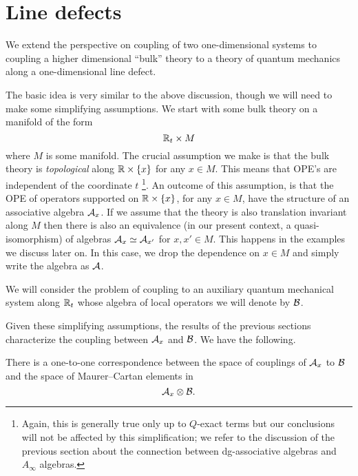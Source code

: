 \documentclass[11pt]{amsart}
\begin{document}

\section{Line defects}
\label{s:lines}


We extend the perspective on coupling of two one-dimensional systems to coupling a higher dimensional ``bulk'' theory to a theory of quantum mechanics along a one-dimensional line defect. 

The basic idea is very similar to the above discussion, though we will need to make some simplifying assumptions. 
We start with some bulk theory on a manifold of the form 
\[
\mathbb R_t \times M 
\] 
where $M$ is some manifold. 
The crucial assumption we make is that the bulk theory is {\em topological} along $\mathbb R \times \{x\}$ for any $x \in M$. 
This means that OPE's are independent of the coordinate $t$ \footnote{Again, this is generally true only up to $Q$-exact terms but our conclusions will not be affected by this simplification; we refer to the discussion of the previous section about the connection between dg-associative algebras and $A_{\infty}$ algebras.}.
An outcome of this assumption, is that the OPE of operators supported on $\mathbb R \times \{x\}$, for any $x \in M$, have the structure of an associative algebra $\mathcal A_x$. 
If we assume that the theory is also translation invariant along $M$ then there is also an equivalence (in our present context, a quasi-isomorphism) of algebras $\mathcal A_x \simeq \mathcal A_{x'}$ for $x, x' \in M$. 
This happens in the examples we discuss later on.
In this case, we drop the dependence on $x \in M$ and simply write the algebra as $\mathcal A$. 

We will consider the problem of coupling to an auxiliary quantum mechanical system along $\mathbb R_t$ whose algebra of local operators we will denote by $\mathcal B$. 

Given these simplifying assumptions, the results of the previous sections characterize the coupling between $\mathcal A_x$ and $\mathcal B$.
We have the following.

\begin{prop}\label{prop:line}
There is a one-to-one correspondence between the space of couplings of $\mathcal A_x$ to $\mathcal B$ and the space of Maurer--Cartan elements in 
\[
\mathcal A_x \otimes \mathcal B .
\]
\end{prop}
\end{document}
